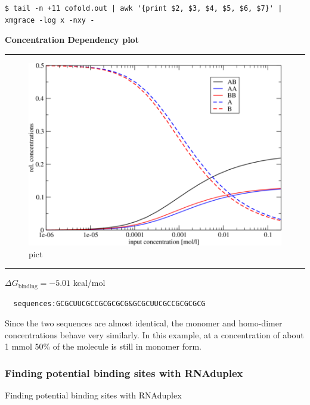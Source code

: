 \documentclass[]{article}
\begin{document}
\begin{verbatim}
$ tail -n +11 cofold.out | awk '{print $2, $3, $4, $5, $6, $7}' | xmgrace -log x -nxy -
\end{verbatim}

\textbf{Concentration Dependency plot}\\

\begin{center}\rule{0.5\linewidth}{\linethickness}\end{center}

\begin{figure}[htbp]
\centering
\includegraphics{Figs/tconcdep.png}
\caption{pict}
\end{figure}

\begin{center}\rule{0.5\linewidth}{\linethickness}\end{center}

\(\Delta G_{\text{binding}} = - 5.01\) kcal/mol

\begin{verbatim}
  sequences:GCGCUUCGCCGCGCGCG&GCGCUUCGCCGCGCGCG
\end{verbatim}

Since the two sequences are almost identical, the monomer and homo-dimer
concentrations behave very similarly. In this example, at a
concentration of about 1 mmol 50\% of the molecule is still in monomer
form.

\subsubsection{Finding potential binding sites with RNAduplex}{Finding potential binding sites with RNAduplex}\label{finding-potential-binding-sites-with-rnaduplex}
\end{document}
